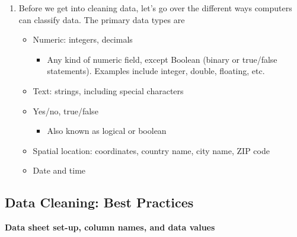 \documentclass[
]{book}
\providecommand{\tightlist}{%
  \setlength{\itemsep}{0pt}\setlength{\parskip}{0pt}}
\begin{document}
\begin{enumerate}
\def\labelenumi{\arabic{enumi}.}
\item
  Before we get into cleaning data, let's go over the different ways computers can classify data. The primary data types are

  \begin{itemize}
  \item
    Numeric: integers, decimals

    \begin{itemize}
    \tightlist
    \item
      Any kind of numeric field, except Boolean (binary or true/false statements). Examples include integer, double, floating, etc.
    \end{itemize}
  \item
    Text: strings, including special characters
  \item
    Yes/no, true/false

    \begin{itemize}
    \tightlist
    \item
      Also known as logical or boolean
    \end{itemize}
  \item
    Spatial location: coordinates, country name, city name, ZIP code
  \item
    Date and time
  \end{itemize}
\end{enumerate}

\hypertarget{data-cleaning-best-practices}{%
\subsection{Data Cleaning: Best Practices}\label{data-cleaning-best-practices}}

\textbf{Data sheet set-up, column names, and data values}
\end{document}
